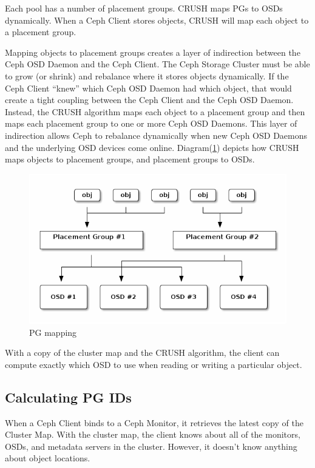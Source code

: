 \documentclass[12pt,a4paper]{report}
\begin{document}
Each pool has a number of placement groups. CRUSH maps PGs to OSDs dynamically.
When a Ceph Client stores objects, CRUSH will map each object to a placement
group.

Mapping objects to placement groups creates a layer of indirection between the
Ceph OSD Daemon and the Ceph Client. The Ceph Storage Cluster must be able to
grow (or shrink) and rebalance where it stores objects dynamically. If the Ceph
Client “knew” which Ceph OSD Daemon had which object, that would create a tight
coupling between the Ceph Client and the Ceph OSD Daemon. Instead, the CRUSH
algorithm maps each object to a placement group and then maps each placement
group to one or more Ceph OSD Daemons. This layer of indirection allows Ceph to
rebalance dynamically when new Ceph OSD Daemons and the underlying OSD devices
come online. Diagram(\ref{fig:pg_mapping}) depicts how CRUSH maps objects to
placement groups, and placement groups to OSDs.

\begin{figure}[h]
	\includegraphics[scale=0.60]{pg_mapping.png}
	\caption{PG mapping}
	\label{fig:pg_mapping}
\end{figure}

With a copy of the cluster map and the CRUSH algorithm, the client can compute
exactly which OSD to use when reading or writing a particular object.

\subsection{Calculating PG IDs}\label{calculating_pg_ids}

When a Ceph Client binds to a Ceph Monitor, it retrieves the latest copy of the
Cluster Map. With the cluster map, the client knows about all of the monitors,
OSDs, and metadata servers in the cluster. However, it doesn't know anything
about object locations.
\end{document}
